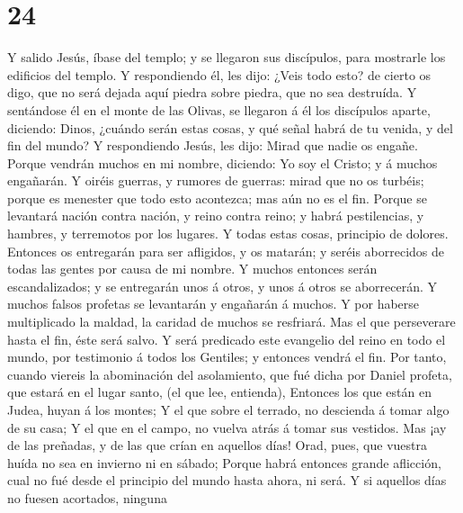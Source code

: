 \hypertarget{section-23}{%
\section{24}\label{section-23}}

 Y salido Jesús, íbase del templo; y se llegaron sus
discípulos, para mostrarle los edificios del templo.  Y
respondiendo él, les dijo: ¿Veis todo esto? de cierto os digo, que no
será dejada aquí piedra sobre piedra, que no sea destruída.
 Y sentándose él en el monte de las Olivas, se llegaron á
él los discípulos aparte, diciendo: Dinos, ¿cuándo serán estas cosas, y
qué señal habrá de tu venida, y del fin del mundo?  Y
respondiendo Jesús, les dijo: Mirad que nadie os engañe. 
Porque vendrán muchos en mi nombre, diciendo: Yo soy el Cristo; y á
muchos engañarán.  Y oiréis guerras, y rumores de guerras:
mirad que no os turbéis; porque es menester que todo esto acontezca; mas
aún no es el fin.  Porque se levantará nación contra
nación, y reino contra reino; y habrá pestilencias, y hambres, y
terremotos por los lugares.  Y todas estas cosas,
principio de dolores.  Entonces os entregarán para ser
afligidos, y os matarán; y seréis aborrecidos de todas las gentes por
causa de mi nombre.  Y muchos entonces serán
escandalizados; y se entregarán unos á otros, y unos á otros se
aborrecerán.  Y muchos falsos profetas se levantarán y
engañarán á muchos.  Y por haberse multiplicado la
maldad, la caridad de muchos se resfriará.  Mas el que
perseverare hasta el fin, éste será salvo.  Y será
predicado este evangelio del reino en todo el mundo, por testimonio á
todos los Gentiles; y entonces vendrá el fin.  Por tanto,
cuando viereis la abominación del asolamiento, que fué dicha por Daniel
profeta, que estará en el lugar santo, (el que lee, entienda),
 Entonces los que están en Judea, huyan á los montes;
 Y el que sobre el terrado, no descienda á tomar algo de
su casa;  Y el que en el campo, no vuelva atrás á tomar
sus vestidos.  Mas ¡ay de las preñadas, y de las que
crían en aquellos días!  Orad, pues, que vuestra huída no
sea en invierno ni en sábado;  Porque habrá entonces
grande aflicción, cual no fué desde el principio del mundo hasta ahora,
ni será.  Y si aquellos días no fuesen acortados, ninguna
